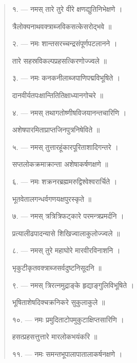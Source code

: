 \documentclass[a4paper, 11pt, oneside, french, landscape, twocolumn]{article}
\begin{document}
\begin{quotation}\footnotesize
\texthindi{१}. --- \texthindi{नमस् तारे तुरे वीरे क्षणद्युतिनिभेक्षणे ।}

\texthindi{त्रैलोक्यनाथवक्त्राब्जविकसत्केसरोद्भवे ॥}

\bigskip

\texthindi{२}. --- \texthindi{नमः शान्तसरच्चन्द्रसंपूर्णपटलानने ।}

\texthindi{तारे सहस्रविकल्पप्रहसत्किरणोज्ज्वले ॥}

\bigskip

\texthindi{३}. --- \texthindi{नमः कनकनीलाब्जपाणिपद्मविभूषिते ।}

\texthindi{दानवीर्यतपःक्षान्तितितिक्षाध्यानगोचरे ॥}

\bigskip

\texthindi{४}. --- \texthindi{नमस् तथागतोष्णीषविजयानन्तचारिणि ।}

\texthindi{अशेषपारमिताप्राप्तजिनपुत्रनिषेविते ॥}

\bigskip

\texthindi{५}. --- \texthindi{नमस् तुत्तारहूंकारपूरिताशादिगन्तरे ।}

\texthindi{सप्तलोकक्रमाक्रान्ता अशेषाकर्षणक्षणे ॥}

\bigskip

\texthindi{६}. --- \texthindi{नमः शक्रनरब्रह्ममरुद्विश्वेश्वरार्चिते ।}

\texthindi{भूतवेतालगन्धर्वगणयक्षपुरस्कृते ॥}

\bigskip

\texthindi{७}. --- \texthindi{नमस् त्रत्रित्रिफट्कारे परमन्त्रप्रमर्दनि ।}

\texthindi{प्रत्यालीढपादन्यासे शिखिज्वालाकुलोज्ज्वले ॥}

\bigskip

\texthindi{८}. --- \texthindi{नमस् तुरे महाघोरे मारवीरविनाशनि ।}

\texthindi{भृकुटीकृतवक्त्राब्जसर्वदुष्टनिसूदनि ॥}

\bigskip

\texthindi{९}. --- \texthindi{नमस् त्रिरत्नमुद्राङ्के हृद्याङ्गुलिविभूषिते ।}

\texthindi{भूषिताशेषदिक्चक्रनिकरे सुकुलाकुले ॥}

\bigskip

\texthindi{१०}. --- \texthindi{नमः प्रमुदिताटोपमुकुटाक्षिप्तसारिणि ।}

\texthindi{हसत्प्रहसत्तुत्तारे मारलोकभयंकरि ॥}

\bigskip

\texthindi{११}. --- \texthindi{नमः समन्तभूपालापातालाकर्षनक्षणे ।}


\end{quotation}
\end{document}
